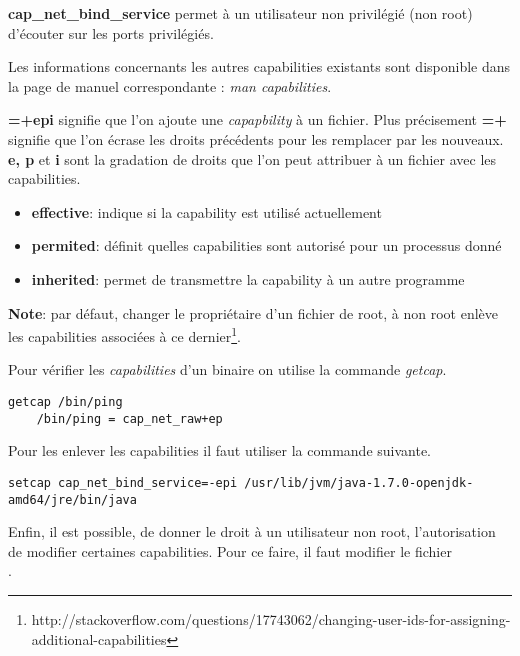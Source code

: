 \textbf{cap\_net\_bind\_service} permet à un utilisateur non privilégié (non root) 
d'écouter sur les ports privilégiés.

Les informations concernants les autres capabilities existants sont disponible dans
la page de manuel correspondante : \emph{man capabilities}.

\textbf{=+epi} signifie que l'on ajoute une \emph{capapbility} à un fichier. Plus 
précisement \textbf{=+} signifie que l'on écrase les droits précédents pour les remplacer
par les nouveaux. \textbf{e, p} et \textbf{i} sont la gradation de droits que l'on peut 
attribuer à un fichier avec les capabilities. 

\begin{itemize}
    \item \textbf{effective}: indique si la capability est utilisé actuellement
    \item \textbf{permited}: définit quelles capabilities sont autorisé pour un 
    processus donné
    \item \textbf{inherited}: permet de transmettre la capability à un autre programme
\end{itemize}
\textbf{Note}: par défaut, changer le propriétaire d'un fichier de root, à non root enlève
les capabilities associées à ce dernier\footnote{\scriptsize{http://stackoverflow.com/questions/17743062/changing-user-ids-for-assigning-additional-capabilities}}.

Pour vérifier les \textit{capabilities} d'un binaire on utilise la commande 
\emph{getcap}.

\begin{lstlisting}[style=code,label={lst:getcapabilities}]
    getcap /bin/ping
    /bin/ping = cap_net_raw+ep
\end{lstlisting}

Pour les enlever les capabilities il faut utiliser la commande suivante.
\begin{lstlisting}[style=code,label={lst:unsetcapabilities}]
setcap cap_net_bind_service=-epi /usr/lib/jvm/java-1.7.0-openjdk-amd64/jre/bin/java
\end{lstlisting}

Enfin, il est possible, de donner le droit à un utilisateur non root, l'autorisation
de modifier certaines capabilities. Pour ce faire, il faut modifier le fichier \\[1mm]
.

